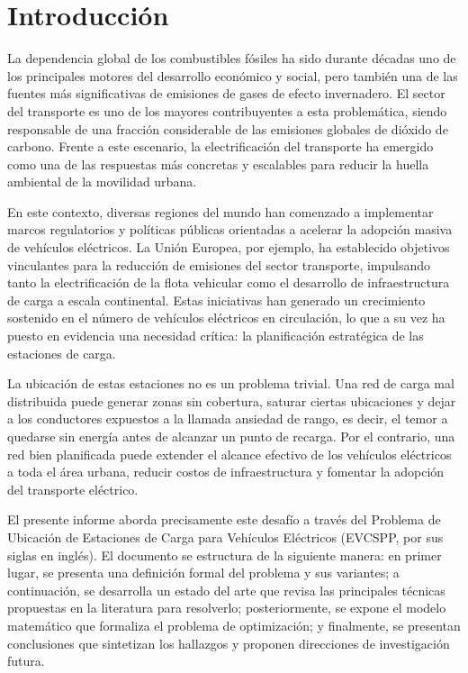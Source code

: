 \documentclass[letter, 10pt]{article}
\begin{document}
\section{Introducci\'on}
La dependencia global de los combustibles fósiles ha sido durante décadas uno de los 
principales motores del desarrollo económico y social, pero también una de las fuentes 
más significativas de emisiones de gases de efecto invernadero. El sector del transporte 
es uno de los mayores contribuyentes a esta problemática, siendo responsable de una 
fracción considerable de las emisiones globales de dióxido de carbono. Frente a este 
escenario, la electrificación del transporte ha emergido como una de las respuestas más 
concretas y escalables para reducir la huella ambiental de la movilidad urbana.

En este contexto, diversas regiones del mundo han comenzado a implementar marcos 
regulatorios y políticas públicas orientadas a acelerar la adopción masiva de vehículos 
eléctricos. La Unión Europea, por ejemplo, ha establecido objetivos vinculantes para la 
reducción de emisiones del sector transporte, impulsando tanto la electrificación de la 
flota vehicular como el desarrollo de infraestructura de carga a escala continental. Estas 
iniciativas han generado un crecimiento sostenido en el número de vehículos eléctricos 
en circulación, lo que a su vez ha puesto en evidencia una necesidad crítica: la 
planificación estratégica de las estaciones de carga.

La ubicación de estas estaciones no es un problema trivial. Una red de carga mal 
distribuida puede generar zonas sin cobertura, saturar ciertas ubicaciones y dejar a los 
conductores expuestos a la llamada ansiedad de rango, es decir, el temor a quedarse sin 
energía antes de alcanzar un punto de recarga. Por el contrario, una red bien planificada 
puede extender el alcance efectivo de los vehículos eléctricos a toda el área urbana, 
reducir costos de infraestructura y fomentar la adopción del transporte eléctrico.

El presente informe aborda precisamente este desafío a través del Problema de Ubicación 
de Estaciones de Carga para Vehículos Eléctricos (EVCSPP, por sus siglas en inglés). 
El documento se estructura de la siguiente manera: en primer lugar, se presenta una 
definición formal del problema y sus variantes; a continuación, se desarrolla un estado 
del arte que revisa las principales técnicas propuestas en la literatura para resolverlo; 
posteriormente, se expone el modelo matemático que formaliza el problema de 
optimización; y finalmente, se presentan conclusiones que sintetizan los hallazgos 
y proponen direcciones de investigación futura.
\end{document}
